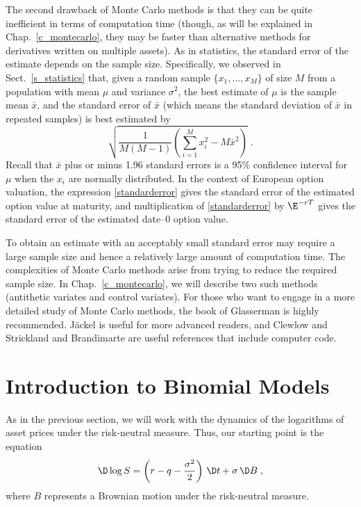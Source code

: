 The second drawback of Monte Carlo methods is that they can be quite inefficient in terms of computation time (though, as will be explained in Chap.~\ref{c_montecarlo}, they may be faster than alternative methods for derivatives written on multiple assets).  As in statistics, the standard error of the estimate depends on the sample size.  Specifically, 
we observed in Sect.~\ref{s_statistics} that, given a random sample $\{x_1,\ldots,x_M\}$ of size $M$ from a population with mean $\mu$ and variance $\sigma^2$, the best estimate of $\mu$ is the sample mean $\bar{x}$, and the standard error of $\bar{x}$ (which means the standard deviation of $\bar{x}$ in repeated samples) is best estimated by
\begin{equation}\label{standarderror}
\sqrt{\frac{1}{M(M-1)}\left(\sum_{i=1}^{M} x_i^2-M\bar{x}^2\right)}\;.
\end{equation} 
Recall that $\bar{x}$ plus or minus 1.96 standard errors is a 95\% confidence interval for~$\mu$ when the $x_i$ are normally distributed.
In the context of European option valuation, the expression \eqref{standarderror} gives the  standard error of the estimated option value at maturity, and multiplication of \eqref{standarderror} by $\E^{-rT}$ gives the standard error of the estimated date--0 option value.

To obtain an estimate with an acceptably small standard error may require a large sample size and hence a relatively large amount of computation time.  The complexities of Monte Carlo methods arise from trying to reduce the required sample size.  In Chap.~\ref{c_montecarlo}, we will describe two such methods (antithetic variates and control variates).   For those who want to engage in a more detailed study of Monte Carlo methods, the book of Glasserman \cite{Glasserman} is highly recommended.  J\"ackel \cite{Jackel} is useful for more advanced readers, and Clewlow and Strickland \cite{CS} and  Brandimarte \cite{Brandimarte} are useful references that include computer code.


\section{Introduction to Binomial Models}\label{s_introbinomial}

As in the previous section,  we will work with the dynamics of the logarithms of asset prices under the risk-neutral measure.  Thus, our starting point is the equation
\begin{equation}\label{logstock_riskneutral}
\D \log S = \left(r-q-\frac{\sigma^2}{2}\right)\,\D t + \sigma\,\D B\;,
\end{equation}
where $B$  represents a Brownian motion under the risk-neutral measure.

